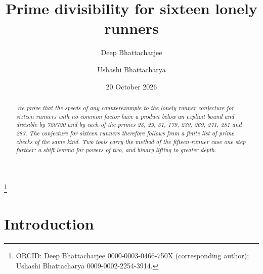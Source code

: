 \documentclass[11pt]{amsart}
\theoremstyle{definition}
\theoremstyle{remark}
\begin{document}
\title{Prime divisibility for sixteen lonely runners}

\author{Deep Bhattacharjee}
\address{Formerly, Electro-Gravitational Space Propulsion Laboratory (EGSPL),
Bhubaneswar, Odisha 751030, India; and formerly, University of Calcutta,
Senate House, 87/1 College Street, Kolkata 700073, West Bengal, India}
\thanks{ORCID: Deep Bhattacharjee 0000-0003-0466-750X (corresponding
author); Ushashi Bhattacharya 0009-0002-2254-3914.}

\author{Ushashi Bhattacharya}
\address{Formerly, National Taiwan University, Taipei 106319, Taiwan}

\date{20 October 2026}

\begin{abstract}
\itshape
We prove that the speeds of any counterexample to the lonely runner conjecture for sixteen runners with no common factor have a product below an explicit bound and divisible by 720720 and by each of the primes 23, 29, 31, 179, 239, 269, 271, 281 and 283. The conjecture for sixteen runners therefore follows from a finite list of prime checks of the same kind. Two tools carry the method of the fifteen-runner case one step further: a shift lemma for powers of two, and binary lifting to greater depth.
\end{abstract}

\maketitle

\setcounter{tocdepth}{1}
\tableofcontents

\section{Introduction}\label{sec:intro}
\end{document}
